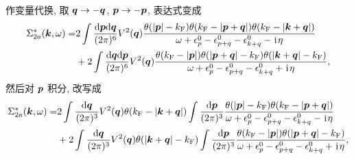 作变量代换, 取 $\boldsymbol{q}\to -\boldsymbol{q}$, $\boldsymbol{p}\to -\boldsymbol{p}$, 表达式变成 
 \begin{align}
        \Sigma_{2a}^* (\boldsymbol{k},\omega) =&2\int\frac{ \mathrm{d} \boldsymbol{p} \mathrm{d} \boldsymbol{q} }{(2\pi)^6}V^2(\boldsymbol{q})
        \frac{
             \theta(|\boldsymbol{p}|-k_{\mathrm{F}})
             \theta(k_{\mathrm{F}}-|\boldsymbol{p}+\boldsymbol{q}|)
             \theta(k_{\mathrm{F}}-|\boldsymbol{k}+\boldsymbol{q}|)
            }{\omega+\epsilon_p^0-\epsilon_{p+q}^0-\epsilon_{k+q}^0-\hspace{0.1em}\mathrm{i}\hspace{0.1em}\eta}\nonumber\\
        &+2\int\frac{\mathrm{d}\boldsymbol{q}\mathrm{d}\boldsymbol{p}}{(2\pi)^6}V^2(\boldsymbol{q})\frac{\theta(k_{\mathrm{F}}-|\boldsymbol{p}|)\theta(|\boldsymbol{p}+\boldsymbol{q}|-k_{\mathrm{F}})\theta(|\boldsymbol{k}+\boldsymbol{q}|-k_{\mathrm{F}})}{\omega+\epsilon_p^0-\epsilon_{p+q}^0-\epsilon_{k+q}^0+\hspace{0.1em}\mathrm{i}\hspace{0.1em}\eta},
    \end{align}
然后对 $\boldsymbol{p}$ 积分, 改写成 
  \begin{align}
        \Sigma_{2a}^*(\boldsymbol{k},\omega)=&2\int\frac{\mathrm{d}\boldsymbol{q}}{(2\pi)^3}V^2(\boldsymbol{q})\theta(k_{\mathrm{F}}-|\boldsymbol{k}+\boldsymbol{q}|)\int\frac{\mathrm{d}\boldsymbol{p}}{(2\pi)^3}\frac{\theta(|\boldsymbol{p}|-k_{\mathrm{F}})\theta(k_{\mathrm{F}}-|\boldsymbol{p}+\boldsymbol{q}|)}{\omega+\epsilon_p^0-\epsilon_{p+q}^0-\epsilon_{k+q}^0-\hspace{0.1em}\mathrm{i}\hspace{0.1em}\eta}\nonumber\\
        &+2\int\frac{\mathrm{d}\boldsymbol{q}}{(2\pi)^3}V^2(\boldsymbol{q})\theta(|\boldsymbol{k}+\boldsymbol{q}|-k_{\mathrm{F}})\int\frac{\mathrm{d}\boldsymbol{p}}{(2\pi)^3}\frac{\theta(k_{\mathrm{F}}-|\boldsymbol{p}|)\theta(|\boldsymbol{p}+\boldsymbol{q}|-k_{\mathrm{F}})}{\omega+\epsilon_p^0-\epsilon_{p+q}^0-\epsilon_{k+q}^0+\hspace{0.1em}\mathrm{i}\hspace{0.1em}\eta},
    \end{align}


